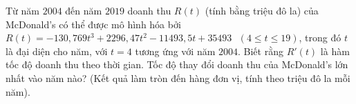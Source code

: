 \begin{bt}%
	Từ năm $2004$ đến năm $2019$ doanh thu $R(t)$ (tính bằng triệu đô la) của McDonald's có thể được mô hình hóa bởi $R(t)=-130{,}769 t^{3}+2296{,}47 t^{2}-11493{,}5 t+35493$ $\,\,(4 \leq t  \leq 19)$, trong đó $t$ là đại diện cho năm, với $t=4$ tương ứng với năm $2004$. Biết rằng $R'(t)$ là hàm tốc độ doanh thu theo thời gian. Tốc độ thay đổi doanh thu của McDonald's lớn nhất vào năm nào? (Kết quả làm tròn đến hàng đơn vị, tính theo triệu đô la mỗi năm).
\end{bt}

